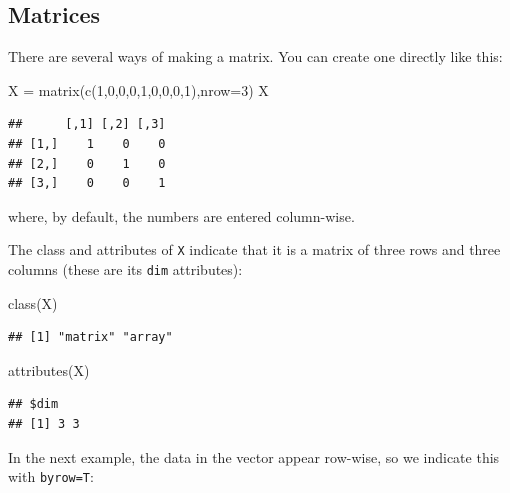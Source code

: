 \documentclass[
]{book}
\newenvironment{Shaded}{\begin{snugshade}}{\end{snugshade}}
\newcommand{\AttributeTok}[1]{\textcolor[rgb]{0.77,0.63,0.00}{#1}}
\newcommand{\DecValTok}[1]{\textcolor[rgb]{0.00,0.00,0.81}{#1}}
\newcommand{\FunctionTok}[1]{\textcolor[rgb]{0.00,0.00,0.00}{#1}}
\newcommand{\NormalTok}[1]{#1}
\newcommand{\OtherTok}[1]{\textcolor[rgb]{0.56,0.35,0.01}{#1}}
\theoremstyle{definition}
\theoremstyle{definition}
\theoremstyle{definition}
\theoremstyle{definition}
\theoremstyle{remark}
\begin{document}
\hypertarget{matrices}{%
\subsection{Matrices}\label{matrices}}

There are several ways of making a matrix. You can create one directly like this:

\begin{Shaded}
\begin{Highlighting}[]
\NormalTok{X }\OtherTok{=} \FunctionTok{matrix}\NormalTok{(}\FunctionTok{c}\NormalTok{(}\DecValTok{1}\NormalTok{,}\DecValTok{0}\NormalTok{,}\DecValTok{0}\NormalTok{,}\DecValTok{0}\NormalTok{,}\DecValTok{1}\NormalTok{,}\DecValTok{0}\NormalTok{,}\DecValTok{0}\NormalTok{,}\DecValTok{0}\NormalTok{,}\DecValTok{1}\NormalTok{),}\AttributeTok{nrow=}\DecValTok{3}\NormalTok{)}
\NormalTok{X}
\end{Highlighting}
\end{Shaded}

\begin{verbatim}
##      [,1] [,2] [,3]
## [1,]    1    0    0
## [2,]    0    1    0
## [3,]    0    0    1
\end{verbatim}

where, by default, the numbers are entered column-wise.

The class and attributes of \texttt{X} indicate that it is a matrix of three rows and three columns (these are its \texttt{dim} attributes):

\begin{Shaded}
\begin{Highlighting}[]
\FunctionTok{class}\NormalTok{(X)}
\end{Highlighting}
\end{Shaded}

\begin{verbatim}
## [1] "matrix" "array"
\end{verbatim}

\begin{Shaded}
\begin{Highlighting}[]
\FunctionTok{attributes}\NormalTok{(X)}
\end{Highlighting}
\end{Shaded}

\begin{verbatim}
## $dim
## [1] 3 3
\end{verbatim}

In the next example, the data in the vector appear row-wise, so we indicate this with \texttt{byrow=T}:
\end{document}

